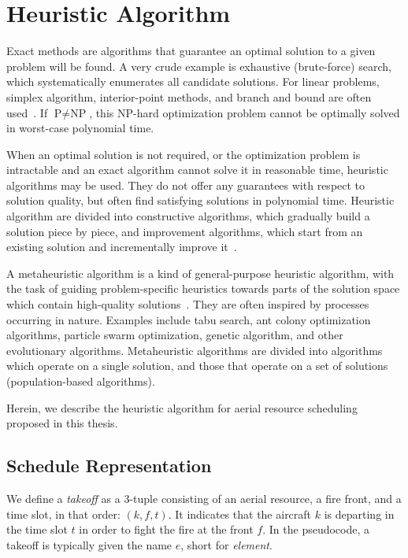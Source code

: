 \chapter{Heuristic Algorithm}

Exact methods are algorithms that guarantee an optimal solution to a given problem will be found.
A very crude example is exhaustive (brute-force) search, which systematically enumerates all candidate solutions.
For linear problems, simplex algorithm, interior-point methods, and branch and bound are often used~\cite{HMO/ExactMethods}.
If $\text{P} \neq \text{NP}$, this NP-hard optimization problem cannot be optimally solved in worst-case polynomial time.

When an optimal solution is not required, or the optimization problem is intractable and an exact algorithm cannot solve it in reasonable time, heuristic algorithms may be used.
They do not offer any guarantees with respect to solution quality, but often find satisfying solutions in polynomial time.
Heuristic algorithm are divided into constructive algorithms, which gradually build a solution piece by piece, and improvement algorithms, which start from an existing solution and incrementally improve it~\cite{Cupic/Metaheuristics}.

A metaheuristic algorithm is a kind of general-purpose heuristic algorithm, with the task of guiding problem-specific heuristics towards parts of the solution space which contain high-quality solutions~\cite{Cupic/Metaheuristics}.
They are often inspired by processes occurring in nature.
Examples include tabu search, ant colony optimization algorithms, particle swarm optimization, genetic algorithm, and other evolutionary algorithms.
Metaheuristic algorithms are divided into algorithms which operate on a single solution, and those that operate on a set of solutions (population-based algorithms).

Herein, we describe the heuristic algorithm for aerial resource scheduling proposed in this thesis.


\section{Schedule Representation}

We define a \textit{takeoff} as a 3-tuple consisting of an aerial resource, a fire front, and a time slot, in that order: $(k, f, t)$.
It indicates that the aircraft $k$ is departing in the time slot $t$ in order to fight the fire at the front $f$.
In the pseudocode, a takeoff is typically given the name $e$, short for \textit{element}.

